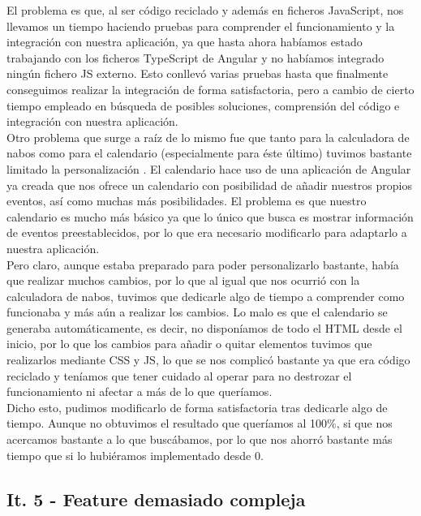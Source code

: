 El problema es que, al ser código reciclado y además en ficheros JavaScript, nos llevamos un tiempo haciendo pruebas para comprender el funcionamiento y la integración con nuestra aplicación, ya que hasta ahora habíamos estado trabajando con los ficheros TypeScript de Angular y no habíamos integrado ningún fichero JS externo. Esto conllevó varias pruebas hasta que finalmente conseguimos realizar la integración de forma satisfactoria, pero a cambio de cierto tiempo empleado en búsqueda de posibles soluciones, comprensión del código e integración con nuestra aplicación.\\

Otro problema que surge a raíz de lo mismo fue que tanto para la calculadora de nabos como para el calendario (especialmente para éste último) tuvimos bastante limitado la personalización \citep{angularcalendar}. El calendario hace uso de una aplicación de Angular ya creada que nos ofrece un calendario con posibilidad de añadir nuestros propios eventos, así como muchas más posibilidades. El problema es que nuestro calendario es mucho más básico ya que lo único que busca es mostrar información de eventos preestablecidos, por lo que era necesario modificarlo para adaptarlo a nuestra aplicación.\\

Pero claro, aunque estaba preparado para poder personalizarlo bastante, había que realizar muchos cambios, por lo que al igual que nos ocurrió con la calculadora de nabos, tuvimos que dedicarle algo de tiempo a comprender como funcionaba y más aún a realizar los cambios. Lo malo es que el calendario se generaba automáticamente, es decir, no disponíamos de todo el HTML desde el inicio, por lo que los cambios para añadir o quitar elementos tuvimos que realizarlos mediante CSS y JS, lo que se nos complicó bastante ya que era código reciclado y teníamos que tener cuidado al operar para no destrozar el funcionamiento ni afectar a más de lo que queríamos.\\

Dicho esto, pudimos modificarlo de forma satisfactoria tras dedicarle algo de tiempo. Aunque no obtuvimos el resultado que queríamos al 100\%, si que nos acercamos bastante a lo que buscábamos, por lo que nos ahorró bastante más tiempo que si lo hubiéramos implementado desde 0.

\subsection{It. 5 - Feature demasiado compleja}

